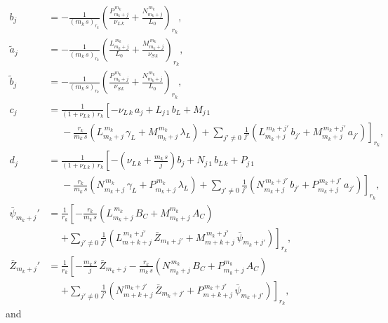 \documentclass[12pt,prb,aps]{revtex4-1}
\begin{document}
\begin{align}
b_j&=- \frac{1}{(m_k\,s)_{r_k}}\left(\frac{P^{\,m_k}_{m_k+j}}{\nu_{L\,k}}+\frac{N^{\,m_k}_{m_k+j}}{L_0}\right)_{r_k},\\[0.5ex]
\tilde{a}_{j}&= -\frac{1}{(m_k\,s)_{r_k}}\left(\frac{L^{\,m_k}_{m_k+j}}{L_0}+\frac{M^{\,m_k}_{m_k+j}}{\nu_{S\,k}}\right)_{r_k},\\[0.5ex]
\tilde{b}_{j}&=- \frac{1}{(m_k\,s)_{r_k}}\left(\frac{P^{\,m_k}_{m_k+j}}{\nu_{S\,k}}+\frac{N^{\,m_k}_{m_k+j}}{L_0}\right)_{r_k},\label{e138}\\[0.5ex]
c_j&= \frac{1}{(1+\nu_{L\,k})\,r_k}\left[-\nu_{L\,k}\,a_j+L_{j\,1}\,b_{L}+M_{j\,1}\right.\nonumber\\[0.5ex]
&\phantom{=}-
\frac{r_k}{m_k\,s}\left(L_{m_k+j}^{\,m_k}\,\gamma_L+M_{m_k+j}^{\,m_k}\,\lambda_L\right) +\left.\sum_{j'\neq 0} \frac{1}{j'}\left(L_{m_k+j}^{\,m_k+j'}\,b_{j'}+ M_{m_k+j}^{\,m_k+j'}\,a_{j'}\right)\right]_{r_k},\\[0.5ex]
d_j&= \frac{1}{(1+\nu_{L\,k})\,r_k}\left[-\left(\nu_{L\,k}+\frac{m_k\,s}{j}\right)b_j+N_{j\,1}\,b_{L\,k}+P_{j\,1}\right.\nonumber\\[0.5ex]
&\phantom{=}-
\frac{r_k}{m_k\,s}\left(N_{m_k+j}^{\,m_k}\,\gamma_L+P_{m_k+j}^{\,m_k}\,\lambda_L\right) +\left.\sum_{j'\neq 0} \frac{1}{j'}\left(N_{m_k+j}^{\,m_k+j'}\,b_{j'}+ P_{m_k+j}^{\,m_k+j'}\,a_{j'}\right)\right]_{r_k},\\[0.5ex]
\bar{\psi}_{m_k+j}' &= \frac{1}{r_k}\left[-\frac{r_k}{m_k\,s}\left(L_{m_k+j}^{\,m_k}\,B_C+ M_{m_k+j}^{m_k}\,A_C\right)\right.\nonumber\\[0.5ex]&\phantom{=}\left.
+ \sum_{j'\neq 0} \frac{1}{j'}\left(L_{m+k+j}^{\,m_k+j'}\,\bar{Z}_{m_k+j'} +M_{m+k+j}^{\,m_k+j'}\,\bar{\psi}_{m_k+j'}\right)\right]_{r_k},\\[0.5ex]
\bar{Z}_{m_k+j}' &= \frac{1}{r_k}\left[-\frac{m_k\,s}{j}\,\bar{Z}_{m_k+j}-\frac{r_k}{m_k\,s}\left(N_{m_k+j}^{\,m_k}\,B_C+ P_{m_k+j}^{m_k}\,A_C\right)\right.\nonumber\\[0.5ex]&\phantom{=}\left.+ 
\sum_{j'\neq 0} \frac{1}{j'}\left(N_{m+k+j}^{\,m_k+j'}\,\bar{Z}_{m_k+j'} +P_{m+k+j}^{\,m_k+j'}\,\bar{\psi}_{m_k+j'}\right)\right]_{r_k},
\end{align}
and
\end{document}
